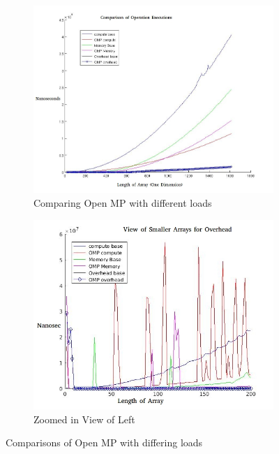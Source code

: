 \documentclass[10pt,8.5in,11in]{article}
\begin{document}
\begin{figure}[h!]
\centering
\begin{subfigure}{.55\textwidth}
  \centering
  \includegraphics[width=\linewidth]{part2}
  \caption{Comparing Open MP with different loads}
\end{subfigure}%
\begin{subfigure}{.55\textwidth}
  \centering
  \includegraphics[width=\linewidth]{part2small}
  \caption{Zoomed in View of Left}
\end{subfigure}
\caption{Comparisons of Open MP with differing loads}
\end{figure}
\end{document}
